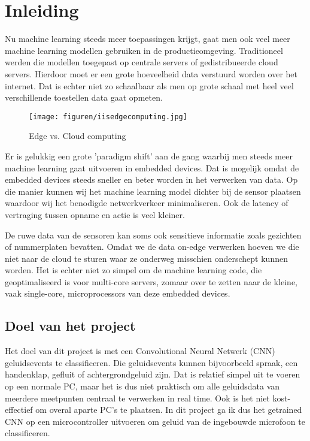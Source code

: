 \section{Inleiding}

Nu machine learning steeds meer toepassingen krijgt, gaat men ook veel meer machine learning modellen gebruiken in de productieomgeving.
Traditioneel werden die modellen toegepast op centrale servers of gedistribueerde cloud servers. Hierdoor moet er een grote hoeveelheid data verstuurd worden over het internet.
Dat is echter niet zo schaalbaar als men op grote schaal met heel veel verschillende toestellen data gaat opmeten. %

\begin{figure}[ht]
	\centering
	\texttt{[image: figuren/iisedgecomputing.jpg]}
	\caption{Edge vs. Cloud computing}
	\cite{flir-edge-computing}
	\label{fig:edge-vs-cloud}
\end{figure}

Er is gelukkig een grote 'paradigm shift' aan de gang waarbij men steeds meer machine learning gaat uitvoeren in embedded devices.
Dat is mogelijk omdat de embedded devices steeds sneller en beter worden in het verwerken van data.
Op die manier kunnen wij het machine learning model dichter bij de sensor plaatsen waardoor wij het benodigde netwerkverkeer minimaliseren.
Ook de latency of vertraging tussen opname en actie is veel kleiner. \cite{flir-edge-computing}

De ruwe data van de sensoren kan soms ook sensitieve informatie zoals gezichten of nummerplaten bevatten. Omdat we de data on-edge verwerken hoeven we die niet naar de cloud te sturen waar ze onderweg misschien onderschept kunnen worden. \cite{flir-edge-computing}
Het is echter niet zo simpel om de machine learning code, die geoptimaliseerd is voor multi-core servers, zomaar over te zetten naar de kleine, vaak single-core, microprocessors van deze embedded devices.

\subsection{Doel van het project}

Het doel van dit project is met een Convolutional Neural Netwerk (CNN) geluidsevents te classificeren.
Die geluidsevents kunnen bijvoorbeeld spraak, een handenklap, gefluit of achtergrondgeluid zijn.
Dat is relatief simpel uit te voeren op een normale PC, maar het is dus niet praktisch om alle geluidsdata van meerdere meetpunten centraal te verwerken in real time.
Ook is het niet kost-effectief om overal aparte PC's te plaatsen. In dit project ga ik dus het getrained CNN op een microcontroller uitvoeren om geluid van de ingebouwde microfoon te classificeren.


